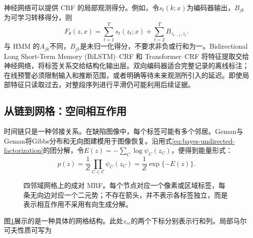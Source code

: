 神经网络可以提供 CRF 的局部观测得分。例如，令$s_t(k;x)$为编码器输出，$B_{jk}$为可学习转移得分，则
\begin{equation}
 F_\theta(z,x)=\sum_{t=1}^{T}s_t(z_t;x)+\sum_{t=2}^{T}B_{z_{t-1},z_t}.
\end{equation}
与 HMM 的$A_{jk}$不同，$B_{jk}$是未归一化得分，不要求非负或行和为一。Bidirectional Long Short-Term Memory (BiLSTM)--CRF 和 Transformer--CRF 将特征提取交给神经网络，将标签关系交给结构化输出层。双向编码器适合完整记录的离线标注；在线预警必须限制输入和推断范围，或者明确等待未来观测所引入的延迟。即使局部特征只读取过去，对整段序列进行平滑仍可能利用后续证据。

\subsection{从链到网格：空间相互作用}
时间链只是一种邻接关系。在缺陷图像中，每个标签可能有多个邻居。Geman与Geman将Gibbs分布和无向图建模用于图像恢复\cite{geman1984mrf}。沿用式\eqref{eq:bayes-undirected-factorization}的团分解，令$E(z)=-\sum_C\log\psi_C(z_C)$，便得到能量形式：
\begin{equation}
 p(z)=\frac{1}{Z}\prod_{C\in\mathcal C}\psi_C(z_C)
 =\frac{1}{Z}\exp\{-E(z)\}.
\end{equation}
\begin{figure}[htbp]
\centering
{}
\caption{四邻域网格上的成对 MRF。每个节点对应一个像素或区域标签，每条无向边对应一个二元势；不存在箭头，并不表示各标签独立，而是表示相互作用不采用有向生成分解。}
\label{fig:bayes-mrf-structure}
\end{figure}
图\ref{fig:bayes-mrf-structure}展示的是一种具体的网格结构。此处$z_{rc}$的两个下标分别表示行和列。局部马尔可夫性质可写为
